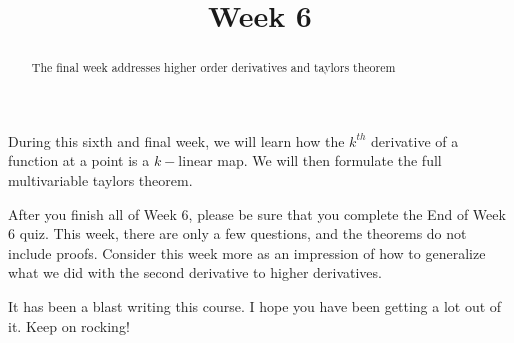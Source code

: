 \documentclass{ximera}
\title{Week 6}
\begin{document}
\begin{abstract}
  The final week addresses higher order derivatives and taylors theorem
\end{abstract}

During this sixth and final week, we will learn how the $k^{th}$
derivative of a function at a point is a $k-$linear map.  We will then
formulate the full multivariable taylors theorem.

After you finish all of Week 6, please be sure that you complete the
End of Week 6 quiz.  This week, there are only a few questions, and
the theorems do not include proofs.  Consider this week more as an
impression of how to generalize what we did with the second derivative
to higher derivatives.

It has been a blast writing this course.  I hope you have been getting
a lot out of it.  Keep on rocking!
\end{document}
